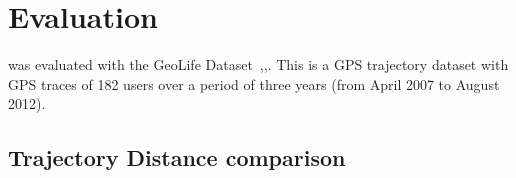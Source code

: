 \section{Evaluation}
\label{sec:eval}
\trajSummary was evaluated with the GeoLife Dataset~\cite{geolife1},\cite{geolife2},\cite{geolife3}. This is a GPS trajectory dataset with GPS traces of 182 users over a period of three years (from April 2007 to August 2012). 

\subsection{Trajectory Distance comparison}
\label{sec:dtwComp}

